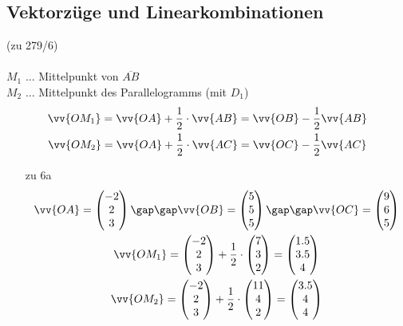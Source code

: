\subsection{Vektorzüge und Linearkombinationen}
(zu 279/6) \\\\
$M_1$ ... Mittelpunkt von $\overline{AB}$ \\
$M_2$ ... Mittelpunkt des Parallelogramms (mit $D_1$)
\begin{gather*}
  \vv{OM_1} = \vv{OA} + \frac{1}{2} \cdot \vv{AB} = \vv{OB} - \frac{1}{2}\vv{AB} \\
  \vv{OM_2} = \vv{OA} + \frac{1}{2} \cdot \vv{AC} = \vv{OC} - \frac{1}{2}\vv{AC}
\end{gather*}
\begin{itemize}
  \item [zu 6a]
  \begin{gather*}
    \vv{OA} = \begin{pmatrix}-2 \\ 2 \\ 3\end{pmatrix} \gap\gap \vv{OB} = \begin{pmatrix}5 \\ 5 \\ 5\end{pmatrix} \gap\gap \vv{OC} = \begin{pmatrix}9 \\ 6 \\ 5\end{pmatrix} \\
    \vv{OM_1} = \begin{pmatrix}-2 \\ 2 \\ 3\end{pmatrix} + \frac{1}{2} \cdot \begin{pmatrix}7 \\ 3 \\ 2\end{pmatrix} = \begin{pmatrix}1.5 \\ 3.5 \\ 4\end{pmatrix} \\
    \vv{OM_2} = \begin{pmatrix}-2 \\ 2 \\ 3\end{pmatrix} + \frac{1}{2} \cdot \begin{pmatrix}11 \\ 4 \\ 2\end{pmatrix} = \begin{pmatrix}3.5 \\ 4 \\ 4\end{pmatrix}

\end{gather*}
\end{itemize}
